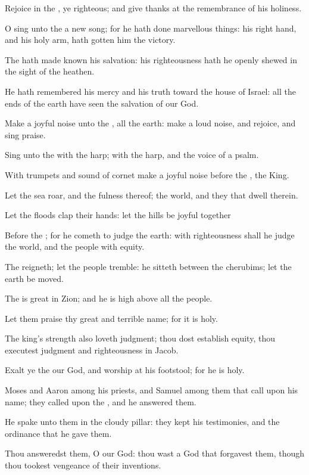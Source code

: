 \Verse Rejoice in the \LORD, ye righteous; and give thanks at the remembrance of his holiness.




\Chapter
\Verse O sing unto the \LORD a new song; for he hath done marvellous things: his right hand, and his holy arm, hath gotten him the victory.

\Verse The \LORD hath made known his salvation: his righteousness hath he openly shewed in the sight of the heathen.

\Verse He hath remembered his mercy and his truth toward the house of Israel: all the ends of the earth have seen the salvation of our God.

\Verse Make a joyful noise unto the \LORD, all the earth: make a loud noise, and rejoice, and sing praise.

\Verse Sing unto the \LORD with the harp; with the harp, and the voice of a psalm.

\Verse With trumpets and sound of cornet make a joyful noise before the \LORD, the King.

\Verse Let the sea roar, and the fulness thereof; the world, and they that dwell therein.

\Verse Let the floods clap their hands: let the hills be joyful together

\Verse Before the \LORD; for he cometh to judge the earth: with righteousness shall he judge the world, and the people with equity.




\Chapter
\Verse The \LORD reigneth; let the people tremble: he sitteth between the cherubims; let the earth be moved.

\Verse The \LORD is great in Zion; and he is high above all the people.

\Verse Let them praise thy great and terrible name; for it is holy.

\Verse The king's strength also loveth judgment; thou dost establish equity, thou executest judgment and righteousness in Jacob.

\Verse Exalt ye the \LORD our God, and worship at his footstool; for he is holy.

\Verse Moses and Aaron among his priests, and Samuel among them that call upon his name; they called upon the \LORD, and he answered them.

\Verse He spake unto them in the cloudy pillar: they kept his testimonies, and the ordinance that he gave them.

\Verse Thou answeredst them, O \LORD our God: thou wast a God that forgavest them, though thou tookest vengeance of their inventions.

